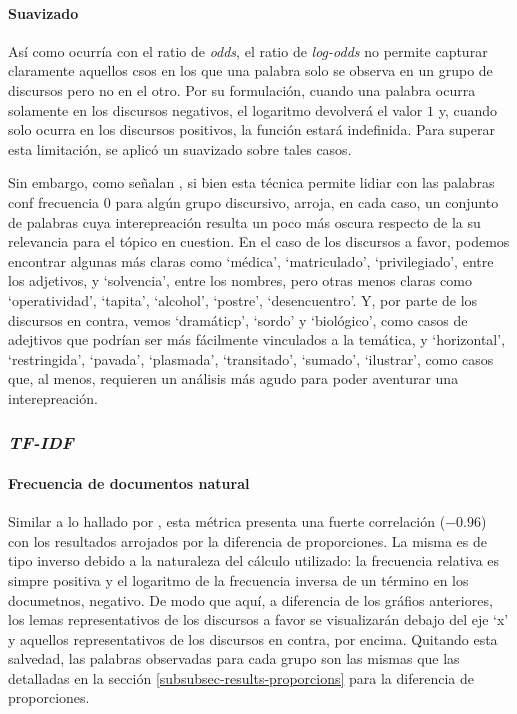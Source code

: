 \paragraph{Suavizado}
Así como ocurría con el ratio de \textit{odds}, el ratio de \textit{log-odds} no
permite capturar claramente aquellos csos en los que una palabra solo se observa en
un grupo de discursos pero no en el otro. Por su formulación, cuando una palabra
ocurra solamente en los discursos negativos, el logaritmo devolverá el valor $1$ y,
cuando solo ocurra en los discursos positivos, la función estará indefinida. Para
superar esta limitación, se aplicó un suavizado sobre tales casos.
\par
Sin embargo, como señalan \cite{monroe2008fightin}, si bien esta técnica permite
lidiar con las palabras conf frecuencia $0$ para algún grupo discursivo, arroja,
en cada caso, un conjunto de palabras cuya interepreación resulta un poco más
oscura respecto de la su relevancia para el tópico en cuestion. En el caso
de los discursos a favor, podemos encontrar algunas más claras como `médica',
`matriculado', `privilegiado', entre los adjetivos, y `solvencia', entre los nombres,
pero otras menos claras como `operatividad', `tapita', `alcohol', `postre',
`desencuentro'. Y, por parte de los discursos en contra, vemos `dramáticp', `sordo' y
`biológico', como casos de adejtivos que podrían ser más fácilmente vinculados a la
temática, y `horizontal', `restringida', `pavada', `plasmada', `transitado', `sumado',
`ilustrar', como casos que, al menos, requieren un análisis más agudo para poder
aventurar una interepreación.

\subsubsection{\textit{TF-IDF}}

\paragraph{Frecuencia de documentos natural}
Similar a lo hallado por \cite{monroe2008fightin}, esta métrica presenta una
fuerte correlación ($-0.96$) con los resultados arrojados por la diferencia
de proporciones. La misma es de tipo inverso debido a la naturaleza del cálculo
utilizado: la frecuencia relativa es simpre positiva y el logaritmo de la
frecuencia inversa de un término en los documetnos, negativo. De modo que aquí,
a diferencia de los gráfios anteriores, los lemas representativos de los discursos
a favor se visualizarán debajo del eje `x' y aquellos representativos de los
discursos en contra, por encima. Quitando esta salvedad, las palabras observadas
para cada grupo son las mismas que las detalladas en la sección
\ref{subsubsec-results-proporcions} para la diferencia de proporciones.


